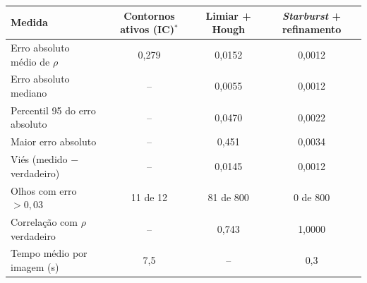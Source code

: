 \begin{tabular}{lccc}
\toprule
Medida & Contornos ativos (IC)$^{*}$ & Limiar + Hough & \textit{Starburst} + refinamento \\
\midrule
Erro absoluto médio de $\rho$ & 0,279 & 0,0152 & 0,0012 \\
Erro absoluto mediano & -- & 0,0055 & 0,0012 \\
Percentil 95 do erro absoluto & -- & 0,0470 & 0,0022 \\
Maior erro absoluto & -- & 0,451 & 0,0034 \\
Viés (medido $-$ verdadeiro) & -- & 0,0145 & 0,0012 \\
Olhos com erro $>0{,}03$ & 11 de 12 & 81 de 800 & 0 de 800 \\
Correlação com $\rho$ verdadeiro & -- & 0,743 & 1,0000 \\
Tempo médio por imagem (s) & 7,5 & -- & 0,3 \\
\bottomrule
\end{tabular}
